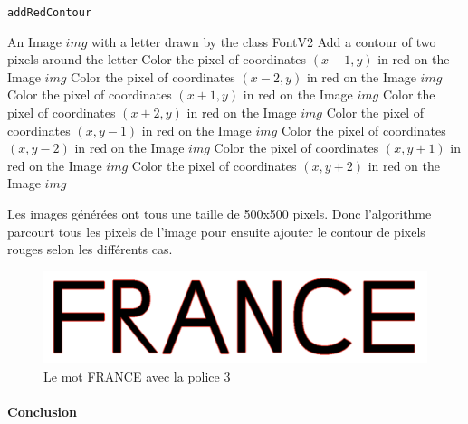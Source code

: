 \documentclass[a4paper, 12pt]{article}
\begin{document}
\begin{algorithm}
	\caption{\texttt{addRedContour}}
		\begin{algorithmic}[1]
		\Require An Image $img$ with a letter drawn by the class FontV2
		\Ensure Add a contour of two pixels around the letter
						\State Color the pixel of coordinates $(x-1, y)$ in red on the Image $img$
						\State Color the pixel of coordinates $(x-2, y)$ in red on the Image $img$
						\EndIf
						\State Color the pixel of coordinates $(x+1, y)$ in red on the Image $img$
						\State Color the pixel of coordinates $(x+2, y)$ in red on the Image $img$
					\EndIf
						\State Color the pixel of coordinates $(x, y-1)$ in red on the Image $img$
						\State Color the pixel of coordinates $(x, y-2)$ in red on the Image $img$
					\EndIf
						\State Color the pixel of coordinates $(x, y+1)$ in red on the Image $img$
						\State Color the pixel of coordinates $(x, y+2)$ in red on the Image $img$ 
					\EndIf	
				\EndIf	
			\EndFor
		\EndFor
		\EndFunction
		\end{algorithmic}
\end{algorithm}

Les images générées ont tous une taille de 500x500 pixels. Donc l'algorithme parcourt tous les pixels de l'image pour ensuite ajouter le contour de pixels rouges selon les différents cas. \\

\begin{figure}[h]
\centering
\includegraphics[scale=0.6]{Images/FRANCE_FontV3.jpeg}
\caption{Le mot FRANCE avec la police 3}
\label{fig7}
\end{figure}
 
\newpage
{} %
	\vspace*{3cm}
	\paragraph{\Huge{Conclusion}}

	\paragraph{}
	
\end{document}
